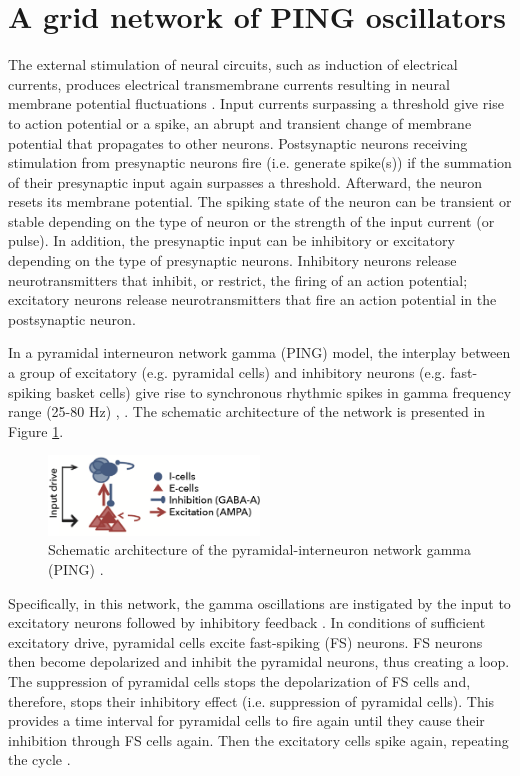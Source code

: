 \section{A grid network of PING oscillators}

The external stimulation of neural circuits, such as induction of electrical currents, produces electrical transmembrane currents resulting in neural membrane potential fluctuations \cite{IzhikevichBook2004:2}. Input currents surpassing a threshold give rise to action potential or a spike, an abrupt and transient change of membrane potential that propagates to other neurons. Postsynaptic neurons receiving stimulation from presynaptic neurons fire (i.e. generate spike(s)) if the summation of their presynaptic input again surpasses a threshold. Afterward, the neuron resets its membrane potential. The spiking state of the neuron can be transient or stable depending on the type of neuron or the strength of the input current (or pulse). In addition, the presynaptic input can be inhibitory or excitatory depending on the type of presynaptic neurons. Inhibitory neurons release neurotransmitters that inhibit, or restrict, the firing of an action potential; excitatory neurons release neurotransmitters that fire an action potential in the postsynaptic neuron.

In a pyramidal interneuron network gamma (PING) model, the interplay between a group of  excitatory (e.g. pyramidal cells) and inhibitory neurons (e.g. fast-spiking basket cells) give rise to synchronous rhythmic spikes in gamma frequency range (25-80 Hz)  \cite{Whittington2000}, \cite{Borgers2003}. The schematic architecture of the network is presented in Figure \ref{fig:single-ping}.

\begin{figure}[!htp]
    \centering
    \includegraphics[width=0.5\textwidth]{assets/images/single-ping.png}
    \caption{Schematic architecture of the pyramidal-interneuron network gamma (PING) \cite{Lowet2015}.
    }
    \label{fig:single-ping}
\end{figure}

Specifically, in this network, the gamma oscillations are instigated by the input to excitatory neurons followed by inhibitory feedback \cite{Whittington2000}. In conditions of sufficient excitatory drive, pyramidal cells excite fast-spiking (FS) neurons. FS neurons then become depolarized and inhibit the pyramidal neurons, thus creating a loop. The suppression of pyramidal cells stops the depolarization of FS cells and, therefore, stops their inhibitory effect (i.e. suppression of pyramidal cells). This provides a time interval for pyramidal cells to fire again until they cause their inhibition through FS cells again. Then the excitatory cells spike again, repeating the cycle \cite{Kopell2011}.

